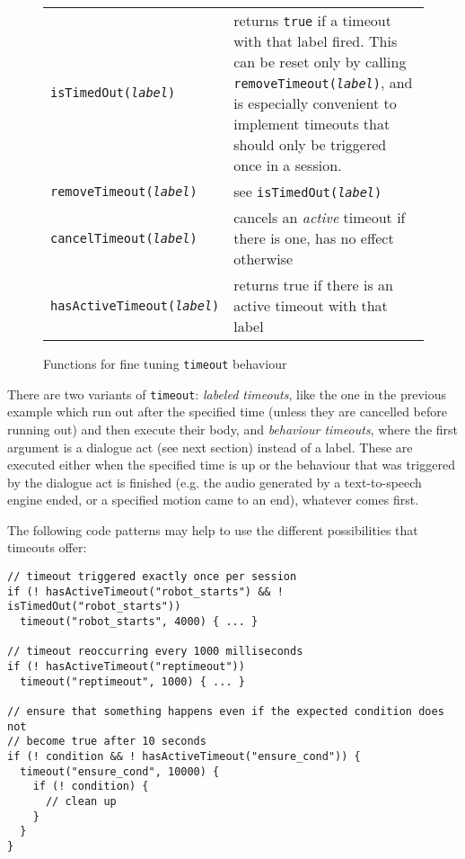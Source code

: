 \begin{figure}[htb]
\begin{tabular}{lp{}}
\texttt{isTimedOut(\emph{label})}& returns \texttt{true} if a timeout with that
  label fired. This can be reset only by calling
  \texttt{removeTimeout(\emph{label})}, and is especially convenient to
  implement timeouts that should only be triggered once in a session. \\
\texttt{removeTimeout(\emph{label})}& see \texttt{isTimedOut(\emph{label})}\\
\texttt{cancelTimeout(\emph{label})}& cancels an \emph{active} timeout if there
                                      is one, has no effect otherwise \\
\texttt{hasActiveTimeout(\emph{label})}& returns true if there is an
  active timeout with that label \\
\end{tabular}
\caption{\label{tbl:timeoutfns}Functions for fine tuning \texttt{timeout} behaviour}
\end{figure}

There are two variants of \texttt{timeout}: \emph{labeled timeouts}, like the
one in the previous example which run out after the specified time (unless they
are cancelled before running out) and then execute their body, and
\emph{behaviour timeouts}, where the first argument is a dialogue act (see next
section) instead of a label. These are executed either when the specified time
is up or the behaviour that was triggered by the dialogue act is finished
(e.g. the audio generated by a text-to-speech engine ended, or a specified
motion came to an end), whatever comes first.

The following code patterns may help to use the different possibilities that
timeouts offer:

{\small%
\begin{lstlisting}
// timeout triggered exactly once per session
if (! hasActiveTimeout("robot_starts") && ! isTimedOut("robot_starts"))
  timeout("robot_starts", 4000) { ... }

// timeout reoccurring every 1000 milliseconds
if (! hasActiveTimeout("reptimeout"))
  timeout("reptimeout", 1000) { ... }

// ensure that something happens even if the expected condition does not
// become true after 10 seconds
if (! condition && ! hasActiveTimeout("ensure_cond")) {
  timeout("ensure_cond", 10000) {
    if (! condition) {
      // clean up
    }
  }
}
\end{lstlisting}}

